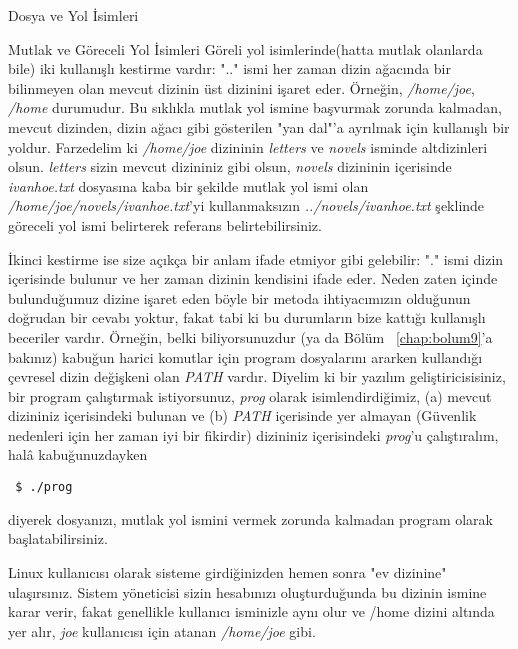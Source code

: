 \begin{section}{Dosya ve Yol İsimleri}
\begin{subsection}{Mutlak ve Göreceli Yol İsimleri}
Göreli yol isimlerinde(hatta mutlak olanlarda bile) iki kullanışlı kestirme vardır: ".." ismi her zaman dizin ağacında bir bilinmeyen olan mevcut dizinin üst dizinini işaret eder. Örneğin, \emph{/home/joe}, \emph{/home} durumudur. Bu sıklıkla mutlak yol ismine başvurmak zorunda kalmadan, mevcut dizinden, dizin ağacı gibi gösterilen "yan dal"'a ayrılmak için kullanışlı bir yoldur. Farzedelim ki \emph{/home/joe} dizininin \emph{letters} ve \emph{novels} isminde altdizinleri olsun. \emph{letters} sizin mevcut dizininiz gibi olsun, \emph{novels} dizininin içerisinde \emph{ivanhoe.txt} dosyasına kaba bir şekilde mutlak yol ismi olan \emph{/home/joe/novels/ivanhoe.txt}'yi kullanmaksızın \emph{../novels/ivanhoe.txt} şeklinde göreceli yol ismi belirterek referans belirtebilirsiniz.
	
İkinci kestirme ise size açıkça bir anlam ifade etmiyor gibi gelebilir: "." ismi dizin içerisinde bulunur ve her zaman dizinin kendisini ifade eder. Neden zaten içinde bulunduğumuz dizine işaret eden böyle bir metoda ihtiyacımızın olduğunun doğrudan bir cevabı yoktur, fakat  tabi ki bu durumların bize kattığı kullanışlı beceriler vardır. Örneğin, belki biliyorsunuzdur (ya da Bölüm ~\ref{chap:bolum9}'a bakınız) kabuğun harici komutlar için program dosyalarını ararken kullandığı çevresel dizin değişkeni olan \emph{PATH} vardır. Diyelim ki bir yazılım geliştiricisisiniz, bir program çalıştırmak istiyorsunuz, \emph{prog} olarak isimlendirdiğimiz, (a) mevcut dizininiz içerisindeki bulunan ve (b) \emph{PATH} içerisinde yer almayan (Güvenlik nedenleri için her zaman iyi bir fikirdir) dizininiz içerisindeki \emph{prog}'u çalıştıralım, halâ kabuğunuzdayken
\footnotesize
\begin{verbatim}
 $ ./prog
\end{verbatim}
\normalsize  
diyerek dosyanızı, mutlak yol ismini vermek zorunda kalmadan program olarak başlatabilirsiniz.

Linux kullanıcısı olarak sisteme girdiğinizden hemen sonra "ev dizinine" ulaşırsınız. Sistem yöneticisi sizin hesabınızı oluşturduğunda bu dizinin ismine karar verir, fakat genellikle kullanıcı isminizle aynı olur ve /home dizini altında yer alır, \emph{joe} kullanıcısı için atanan \emph{/home/joe} gibi.

\end{subsection}
\end{section}

